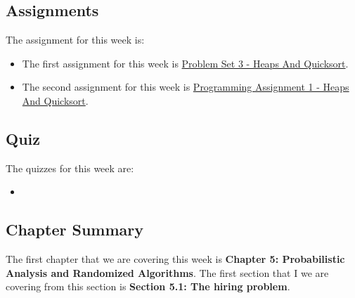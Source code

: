 \subsection{Assignments}

The assignment for this week is:

\begin{itemize}
    \item The first assignment for this week is \href{https://github.com/QuantumCompiler/CU/tree/main/CSPB%203104%20-%20Algorithms/CSPB%203104%20-%20Assignments/CSPB%203104%20-%20Problem%20Sets/CSPB%203104%20-%20Problem%20Set%203%20-%20Heaps%20And%20Quicksort}{Problem Set 3 - Heaps And Quicksort}. 
    \item The second assignment for this week is \href{https://github.com/QuantumCompiler/CU/tree/main/CSPB%203104%20-%20Algorithms/CSPB%203104%20-%20Assignments/CSPB%203104%20-%20Programming%20Assignments/CSPB%203104%20-%20Programming%20Assignment%201%20-%20Heaps%20And%20Quicksort}{Programming Assignment 1 - Heaps And Quicksort}. 
\end{itemize}

\subsection{Quiz}

The quizzes for this week are:

\begin{itemize}
    \item {} \textbullet {} 
\end{itemize}

\subsection{Chapter Summary}

The first chapter that we are covering this week is \textbf{Chapter 5: Probabilistic Analysis and Randomized Algorithms}. The first section that I we are covering from this section is \textbf{Section 5.1: The hiring problem}.

